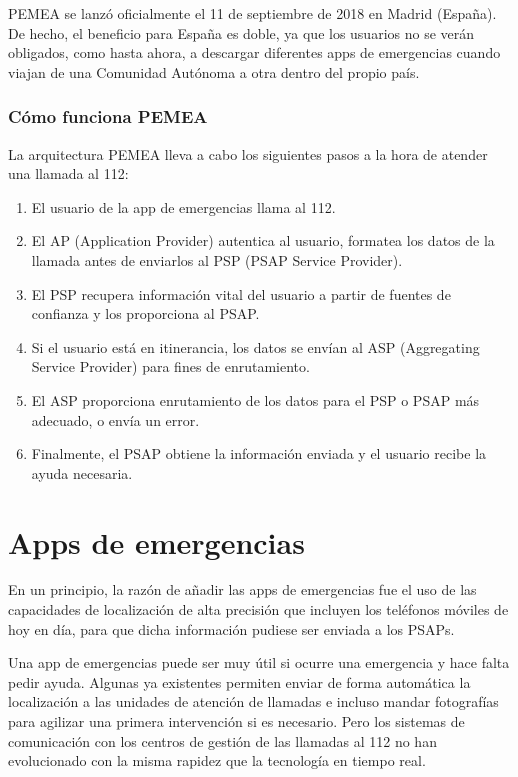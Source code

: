 PEMEA se lanzó oficialmente el 11 de septiembre de 2018 en Madrid (España). De hecho, el beneficio para España es doble, ya que los usuarios no se verán obligados, como hasta ahora, a descargar diferentes apps de emergencias cuando viajan de una Comunidad Autónoma a otra dentro del propio país.

\subsubsection{Cómo funciona PEMEA}

La arquitectura PEMEA lleva a cabo los siguientes pasos a la hora de atender una llamada al 112:

\begin{enumerate}
  \item El usuario de la app de emergencias llama al 112.
  \item El AP (Application Provider) autentica al usuario, formatea los datos de la llamada antes de enviarlos al PSP (PSAP Service Provider).
  \item El PSP recupera información vital del usuario a partir de fuentes de confianza y los proporciona al PSAP.
  \item Si el usuario está en itinerancia, los datos se envían al ASP (Aggregating Service Provider) para fines de enrutamiento.
  \item El ASP proporciona enrutamiento de los datos para el PSP o PSAP más adecuado, o envía un error.
  \item Finalmente, el PSAP obtiene la información enviada y el usuario recibe la ayuda necesaria.
\end{enumerate}

\clearpage

\section{Apps de emergencias}

En un principio, la razón de añadir las apps de emergencias fue el uso de las capacidades de localización de alta precisión que incluyen los teléfonos móviles de hoy en día, para que dicha información pudiese ser enviada a los PSAPs.

Una app de emergencias puede ser muy útil si ocurre una emergencia y hace falta pedir ayuda. Algunas ya existentes permiten enviar de forma automática la localización a las unidades de atención de llamadas e incluso mandar fotografías para agilizar una primera intervención si es necesario. Pero los sistemas de comunicación con los centros de gestión de las llamadas al 112 no han evolucionado con la misma rapidez que la tecnología en tiempo real.

